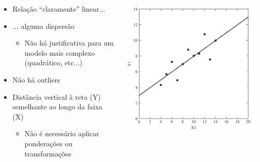 \documentclass{beamer}
\begin{document}
\begin{frame}{}
  \begin{columns}
    \begin{column}{.5\textwidth}
      \begin{itemize}
        \tiny
      \item<2-4> Relação ``claramente'' linear...
      \item<2-4> ... alguma dispersão
        \begin{itemize}
          \tiny
        \item<4> Não há justificativa para um modelo mais
          complexo (quadrático, etc...)
      \end{itemize}
      \item<5> Não há outliers
      \item<6,7> Distância vertical à reta (Y) semelhante ao longo da faixa (X)
        \begin{itemize}
          \tiny
        \item<7> Não é necessário aplicar ponderações ou transformações
        \end{itemize}
      \end{itemize}
    \end{column}
    \begin{column}{.5\textwidth}
      \begin{center}
        \includegraphics[width=\textwidth]{EDA/eda-dispersao1}
      \end{center}
    \end{column}
  \end{columns}
\end{frame}
\end{document}
